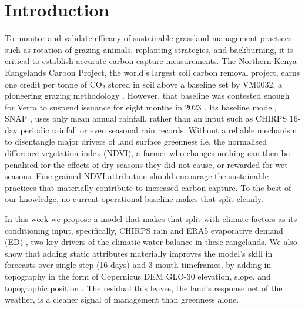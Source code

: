 \documentclass[letterpaper]{article} %
\begin{document}
\section{Introduction}
To monitor and validate efficacy of sustainable grassland management practices such as rotation of grazing animals, replanting strategies, and backburning, it is critical to establish accurate carbon capture measurements. The Northern Kenya Rangelands Carbon Project, the world's largest soil carbon removal project, earns one credit per tonne of CO$_2$ stored in soil above a baseline set by VM0032, a pioneering grazing methodology \citep{vm0032,verra2023}. However, that baseline was contested enough for Verra to suspend issuance for eight months in 2023 \citep{verra2023}. Its baseline model, SNAP \citep{ritchie2014,nkgcp_pd2016}, uses only mean annual rainfall, rather than an input such as CHIRPS 16-day periodic rainfall \citep{chirps} or even seasonal rain records. Without a reliable mechanism to disentangle major drivers of land surface greenness i.e. the normalised difference vegetation index (NDVI),  a farmer who changes nothing can then be penalised for the effects of dry seasons they did not cause, or rewarded for wet seasons. Fine-grained NDVI attribution should encourage the sustainable practices that materially contribute to increased carbon capture. To the best of our knowledge, no current operational baseline makes that split cleanly.


In this work we propose a model that makes that split with climate factors as its conditioning input, specifically, CHIRPS rain and ERA5 evaporative demand (ED) \citep{hersbach2020}, two key drivers of the climatic water balance \citep{spei} in these rangelands. We also show that adding static attributes \citep{kratzert2019} materially improves the model's skill in forecasts over single-step (16 days) and 3-month timeframes, by adding in topography in the form of Copernicus DEM GLO-30 elevation, slope, and topographic position \citep{copdem}. The residual this leaves, the land's response net of the weather, is a cleaner signal of management than greenness alone.
\end{document}
